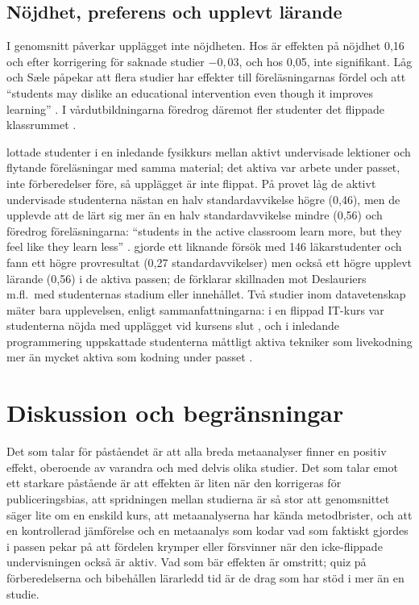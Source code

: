 \subsection{Nöjdhet, preferens och upplevt lärande}

I genomsnitt påverkar upplägget inte nöjdheten. Hos
\textcite[9]{LagSaele2019} är effekten på nöjdhet 0,16 och efter
korrigering för saknade studier \(-0{,}03\), och hos
\textcite[tabell~3, s.~10]{vanAlten2019} 0,05, inte signifikant. Låg och
Sæle påpekar att flera
studier har effekter till föreläsningarnas fördel och att
\enquote{students may dislike an educational intervention even though it
improves learning} \parencite[12]{LagSaele2019}. I vårdutbildningarna
föredrog däremot fler studenter det flippade klassrummet
\parencite{HewLo2018}.

\textcite{Deslauriers2019} lottade studenter i en inledande fysikkurs
mellan aktivt undervisade lektioner och flytande föreläsningar med samma
material; det aktiva var arbete under passet, inte förberedelser före,
så upplägget är inte flippat. På provet låg de aktivt undervisade
studenterna nästan en halv standardavvikelse högre (0,46), men de
upplevde att de lärt sig mer än en halv standardavvikelse mindre (0,56)
och föredrog föreläsningarna: \enquote{students in the active classroom
learn more, but they feel like they learn less}
\parencite[19251]{Deslauriers2019}. \textcite{Boedeker2025} gjorde
ett liknande försök med 146 läkarstudenter och fann ett högre provresultat (0,27
standardavvikelser) men också ett högre upplevt lärande (0,56) i de
aktiva passen; de förklarar skillnaden mot Deslauriers m.fl.\ med
studenternas stadium eller innehållet. Två studier inom datavetenskap
mäter bara upplevelsen, enligt sammanfattningarna: i en flippad IT-kurs
var studenterna nöjda med upplägget vid kursens slut
\parencite{Elliott2014}, och i inledande programmering uppskattade
studenterna måttligt aktiva tekniker som livekodning mer än mycket aktiva
som kodning under passet \parencite{SoosaiRaj2018}.

\section{Diskussion och begränsningar}

Det som talar för påståendet är att alla breda metaanalyser finner en
positiv effekt, oberoende av varandra och med delvis olika studier. Det
som talar emot ett starkare påstående är att effekten är liten när den
korrigeras för publiceringsbias, att spridningen mellan studierna är så
stor att genomsnittet säger lite om en enskild kurs, att metaanalyserna
har kända metodbrister, och att en kontrollerad jämförelse och en
metaanalys som kodar vad som faktiskt gjordes i passen
\parencite{Jensen2015,Kapur2022} pekar på att fördelen krymper eller
försvinner när den icke-flippade undervisningen också är aktiv. Vad som
bär effekten är omstritt; quiz på förberedelserna och bibehållen
lärarledd tid är de drag som har stöd i mer än en studie.

